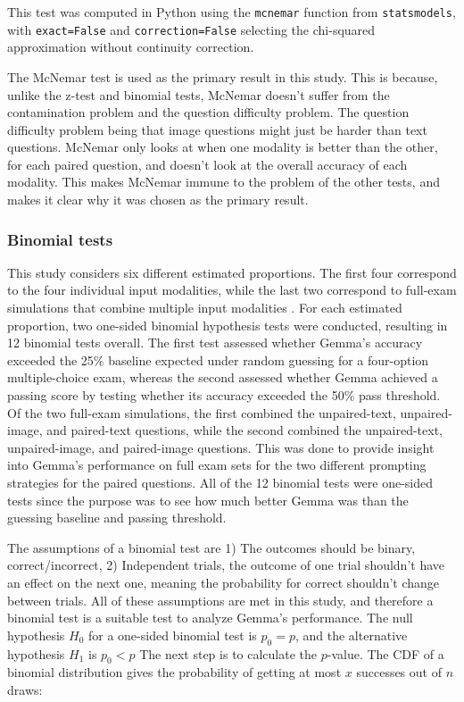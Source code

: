 \documentclass{article}
\begin{document}
This test was computed in Python using the \texttt{mcnemar} function from \texttt{statsmodels}, with \texttt{exact=False} and \texttt{correction=False} selecting the chi-squared approximation without continuity correction.

The McNemar test is used as the primary result in this study. This is because, unlike the z-test and binomial tests, McNemar doesn't suffer from the contamination problem and the question difficulty problem. The question difficulty problem being that image questions might just be harder than text questions. McNemar only looks at when one modality is better than the other, for each paired question, and doesn't look at the overall accuracy of each modality. This makes McNemar immune to the problem of the other tests, and makes it clear why it was chosen as the primary result.

\subsubsection{Binomial tests}

This study considers six different estimated proportions. The first four correspond to the four individual input modalities, while the last two correspond to full-exam simulations that combine multiple input modalities . For each estimated proportion, two one-sided binomial hypothesis tests were conducted, resulting in 12 binomial tests overall. The first test assessed whether Gemma's accuracy exceeded the 25\% baseline expected under random guessing for a four-option multiple-choice exam, whereas the second assessed whether Gemma achieved a passing score by testing whether its accuracy exceeded the 50\% pass threshold.\newline
Of the two full-exam simulations, the first combined the unpaired-text, unpaired-image, and paired-text questions, while the second combined the unpaired-text, unpaired-image, and paired-image questions. This was done to provide insight into Gemma's performance on full exam sets for the two different prompting strategies for the paired questions.
\newline
All of the 12 binomial tests were one-sided tests since the purpose was to see how much better Gemma was than the guessing baseline and passing threshold.

The assumptions of a binomial test are 1) The outcomes should be binary, correct/incorrect, 2) Independent trials, the outcome of one trial shouldn't have an effect on the next one, meaning the probability for correct shouldn't change between trials. All of these assumptions are met in this study, and therefore a binomial test is a suitable test to analyze Gemma's performance.\newline 
\newline
The null hypothesis $H_0$ for a one-sided binomial test is $p_0=p$, and the alternative hypothesis $H_1$ is $p_0<p$\newline
The next step is to calculate the $p$-value. The CDF of a binomial distribution gives the probability of getting at most $x$ successes out of $n$ draws:
\end{document}

